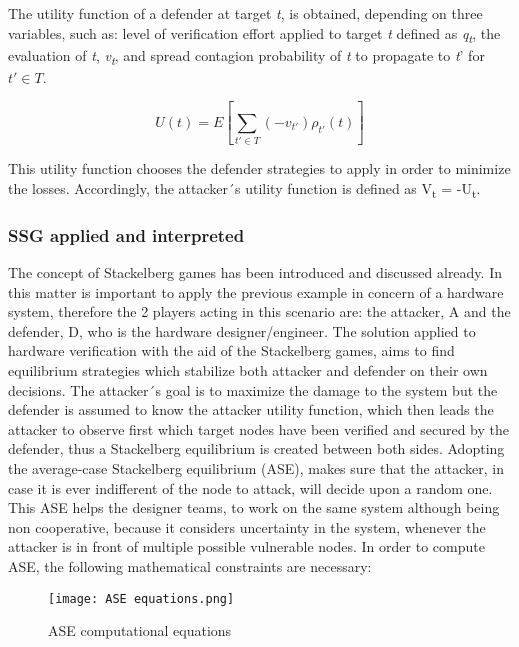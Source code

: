 \documentclass[conference]{IEEEtran}
\begin{document}
The utility function of a defender at target \textit{t}, is obtained, depending on three variables, such as: level of verification effort applied to target \textit{t} defined as \textit{q\textsubscript{t}}, the evaluation of \textit{t}, \textit{v\textsubscript{t}}, and spread contagion probability of \textit{t} to propagate to \textit{t}' for $\textit{t}' \in T$.

\begin{displaymath}
U(t) = E[\sum_{t'\in T}(-v_{t'})\rho_{t'}(t)]
\end{displaymath}


This utility function chooses the defender strategies to apply in order to minimize the losses. Accordingly, the attacker´s utility function is defined as V\textsubscript{t} = -U\textsubscript{t}.

\subsubsection{SSG applied and interpreted}
The concept of Stackelberg games has been introduced and discussed already. In this matter is important to apply the previous example in concern of a hardware system, therefore the 2 players acting in this scenario are: the attacker, A and the defender, D, who is the hardware designer/engineer.
The solution applied to hardware verification with the aid of the Stackelberg games, aims to find equilibrium strategies which stabilize both attacker and defender on their own decisions. The attacker´s goal is to maximize the damage to the system but the defender is assumed to know the attacker utility function, which then leads the attacker to observe first which target nodes have been verified and secured by the defender, thus a Stackelberg equilibrium is created between both sides. Adopting the average-case Stackelberg equilibrium (ASE), makes sure that the attacker, in case it is ever indifferent of the node to attack, will decide upon a random one. This ASE helps the designer teams, to work on the same system although being non cooperative, because it considers uncertainty in the system, whenever the attacker is in front of multiple possible vulnerable nodes.
In order to compute ASE, the following mathematical constraints are necessary:
\begin{figure}[h]
    \centerline{\texttt{[image: ASE equations.png]}}
    \caption{ASE computational equations \cite{b9}}
    \label{ase}
\end{figure} 
\end{document}
